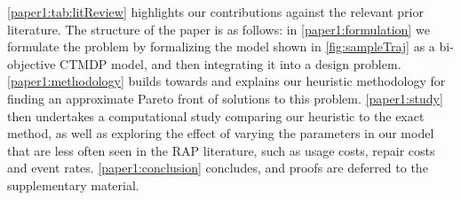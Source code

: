 \documentclass[11pt,authoryear,a4paper]{article}
\theoremstyle{definition}
\begin{document}

\autoref{paper1:tab:litReview} highlights our contributions against the relevant prior literature. The structure of the paper is as follows: in \autoref{paper1:formulation} we formulate the problem by formalizing the model shown in \autoref{fig:sampleTraj} as a bi-objective CTMDP model, and then integrating it into a design problem. \autoref{paper1:methodology} builds towards and explains our heuristic methodology for finding an approximate Pareto front of solutions to this problem. \autoref{paper1:study} then undertakes a computational study comparing our heuristic to the exact method, as well as exploring the effect of varying the parameters in our model that are less often seen in the RAP literature, such as usage costs, repair costs and event rates. \autoref{paper1:conclusion} concludes, and proofs are deferred to the supplementary material.
\end{document}
